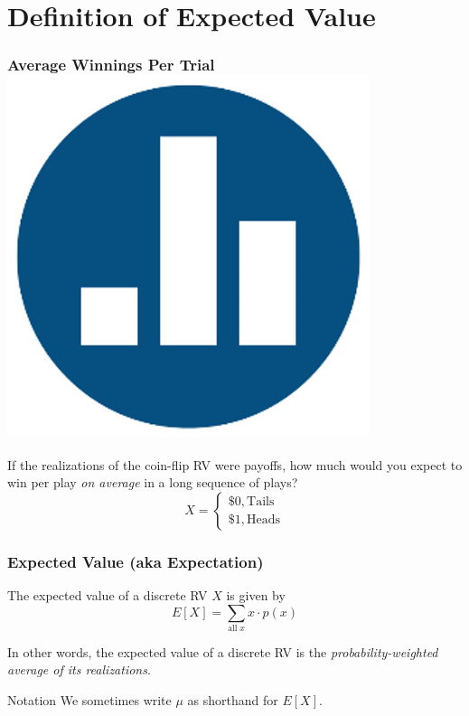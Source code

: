 \section{Definition of Expected Value}
\begin{frame}
\frametitle{Average Winnings Per Trial \hfill \includegraphics[scale = 0.05]{./images/clicker}}
If the realizations of the coin-flip RV were \alert{payoffs}, how much would you expect to win per play \emph{on average} in a long sequence of plays?
$$X = \left\{ \begin{array}{l}  \$0, \mbox{Tails}\\ \$1, \mbox{Heads}\end{array} \right.$$
\end{frame}
\begin{frame}
\frametitle{Expected Value (aka Expectation)}
The expected value of a discrete RV $X$ is given by
	$$E[X] = \sum_{\mbox{all} \; x} x \cdot p(x)$$

  \vspace{1em}
  \alert{In other words, the expected value of a discrete RV is the \emph{probability-weighted average of its realizations}.}

  \vspace{1em}

  \begin{block}{Notation}
    We sometimes write $\mu$ as shorthand for $E[X]$.  \end{block}
\end{frame}
